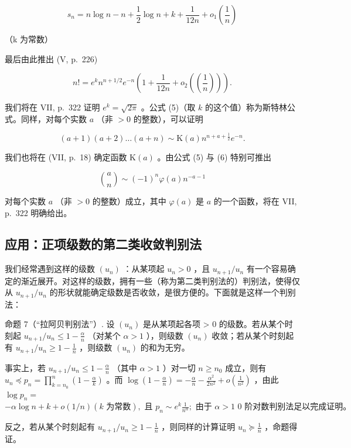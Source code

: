 \[
s _ {n} = n \log n - n + \frac {1}{2} \log n + k + \frac {1}{1 2 n} + o _ {1} \left(\frac {1}{n}\right)
\]

（k 为常数）

最后由此推出 (V, p.~226)

\[
n! = e ^ {k} n ^ {n + 1 / 2} e ^ {- n} \left(1 + \frac {1}{1 2 n} + o _ {2} \left(\left(\frac {1}{n}\right)\right)\right).\tag{5}
\]

我们将在 VII, p.~322 证明 \(e^k = \sqrt{2\pi}\) 。公式 (5)（取 \(k\) 的这个值）称为斯特林公式。同样，对每个实数 \(a\) （非 \(>0\) 的整数），可以证明

\[
(a + 1) (a + 2) \dots (a + n) \sim \mathrm{K} (a) n ^ {n + a + \frac {1}{2}} e ^ {- n}.\tag{6}
\]

我们也将在 (VII, p.~18) 确定函数 \(\mathrm{K}(a)\) 。由公式 (5) 与 (6) 特别可推出

\[
\binom {a} {n} \sim (- 1) ^ {n}   \varphi (a)   n ^ {- a - 1}\tag{7}
\]

对每个实数 \(a\) （非 \(> 0\) 的整数）成立，其中 \(\varphi(a)\) 是 \(a\) 的一个函数，将在 VII, p.~322 明确给出。

\subsection{应用：正项级数的第二类收敛判别法}

我们经常遇到这样的级数 \((u_{n})\) ：从某项起 \(u_{n} > 0\) ，且 \(u_{n+1}/u_{n}\) 有一个容易确定的渐近展开。对这样的级数，拥有一些（称为第二类判别法的）判别法，使得仅从 \(u_{n+1}/u_{n}\) 的形状就能确定级数是否收敛，是很方便的。下面就是这样一个判别法：

命题 7（“拉阿贝判别法”）. 设 \((u_{n})\) 是从某项起各项 \textgreater{} 0 的级数。若从某个时刻起 \(u_{n+1}/u_{n} \leqslant 1 - \frac{\alpha}{n}\) （对某个 \(\alpha > 1\) ），则级数 \((u_{n})\) 收敛；若从某个时刻起有 \(u_{n+1}/u_{n} \geqslant 1 - \frac{1}{n}\) ，则级数 \((u_{n})\) 的和为无穷。

事实上，若 \(u_{n+1} / u_n \leqslant 1 - \frac{\alpha}{n}\) （其中 \(\alpha > 1\) ）对一切 \(n \geqslant n_0\) 成立，则有 \(u_n \preccurlyeq p_n = \prod_{k=n_0}^{n} \left(1 - \frac{\alpha}{k}\right)\) 。而 \(\log \left(1 - \frac{\alpha}{n}\right) = -\frac{\alpha}{n} - \frac{\alpha^2}{2n^2} + o\left(\frac{1}{n^2}\right)\) ，由此 \(\log p_n =\) \(-\alpha \log n + k + o(1/n) (k \text{ 为常数}), \text{ 且 } p_n \sim e^k \frac{1}{n^\alpha}; \text{ 由于 } \alpha > 1 \text{ 0 阶对数判别法足以完成证明。}\)

反之，若从某个时刻起有 \(u_{n + 1} / u_n \geqslant 1 - \frac{1}{n}\) ，则同样的计算证明 \(u_n \succcurlyeq \frac{1}{n}\) ，命题得证。


